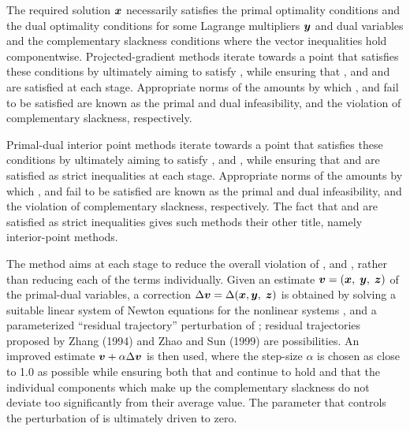 \documentclass{galahad}
\begin{document}

\galmethod
The required solution ${\bm{x}}$ necessarily satisfies
the primal optimality conditions
and 
the dual optimality conditions
for some Lagrange multipliers ${\bm{y}}$ and dual variables
and the complementary slackness conditions
where the vector inequalities hold componentwise.
Projected-gradient methods iterate towards a point
that satisfies these conditions by ultimately aiming to satisfy
, while ensuring that
, and  and  are satisfied at each stage.
Appropriate norms of the amounts by
which ,  and  fail to be satisfied are known as the
primal and dual infeasibility, and the violation of complementary slackness,
respectively.

Primal-dual interior point methods iterate towards a point
that satisfies these conditions by ultimately aiming to satisfy
,  and , while ensuring that
 and  are
satisfied as strict inequalities at each stage.
Appropriate norms of the amounts by
which ,  and  fail to be satisfied are known as the
primal and dual infeasibility, and the violation of complementary slackness,
respectively. The fact that  and  are satisfied as strict
inequalities gives such methods their other title, namely
interior-point methods.

The method aims at each stage to reduce the
overall violation of ,  and ,
rather than reducing each of the terms individually. Given an estimate
${\bm{v}} = ({\bm{x}}, \; {\bm{y}}, \; {\bm{z}})$
of the primal-dual variables, a correction
$\Delta {\bm{v}} = \Delta ({\bm{x}}, {\bm{y}}, \;{\bm{z}} )$
is obtained by solving a suitable linear system of Newton equations for the
nonlinear systems ,  and a parameterized ``residual
trajectory'' perturbation of ; residual trajectories
proposed by Zhang (1994) and Zhao and Sun (1999) are possibilities.
An improved estimate ${\bm{v}} + \alpha \Delta {\bm{v}}$
is then used, where the step-size $\alpha$
is chosen as close to 1.0 as possible while ensuring both that
 and  continue to hold and that the individual components
which make up the complementary slackness
 do not deviate too significantly
from their average value. The parameter that controls the perturbation
of  is ultimately driven to zero.
\end{document}
